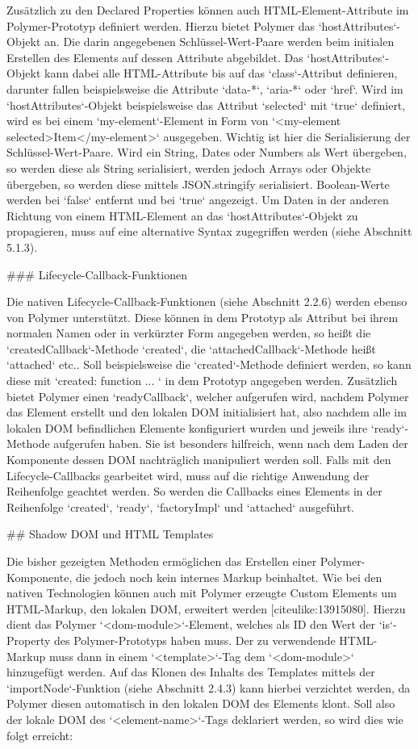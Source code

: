 Zusätzlich zu den Declared Properties können auch HTML-Element-Attribute im Polymer-Prototyp definiert werden. Hierzu bietet Polymer das `hostAttributes`-Objekt an. Die darin angegebenen Schlüssel-Wert-Paare werden beim initialen Erstellen des Elements auf dessen Attribute abgebildet. Das `hostAttributes`-Objekt kann dabei alle HTML-Attribute bis auf das `class`-Attribut definieren, darunter fallen beispielsweise die Attribute `data-*`, `aria-*` oder `href`. Wird im `hostAttributes`-Objekt beispielsweise das Attribut `selected` mit `true` definiert, wird es bei einem `my-element`-Element in Form von `<my-element selected>Item</my-element>` ausgegeben. Wichtig ist hier die Serialisierung der Schlüssel-Wert-Paare. Wird ein String, Dates oder Numbers als Wert übergeben, so werden diese als String serialisiert, werden jedoch Arrays oder Objekte übergeben, so werden diese mittels JSON.stringify serialisiert. Boolean-Werte werden bei `false` entfernt und bei `true` angezeigt. Um Daten in der anderen Richtung von einem HTML-Element an das `hostAttributes`-Objekt zu propagieren, muss auf eine alternative Syntax zugegriffen werden (siehe Abschnitt 5.1.3).


### Lifecycle-Callback-Funktionen

Die nativen Lifecycle-Callback-Funktionen (siehe Abschnitt 2.2.6) werden ebenso von Polymer unterstützt. Diese können in dem Prototyp als Attribut bei ihrem normalen Namen oder in verkürzter Form angegeben werden, so heißt die `createdCallback`-Methode `created`, die `attachedCallback`-Methode heißt `attached` etc.. Soll beispielsweise die `created`-Methode definiert werden, so kann diese mit `created: function { ... }` in dem Prototyp angegeben werden. Zusätzlich bietet Polymer einen `readyCallback`, welcher aufgerufen wird, nachdem Polymer das Element erstellt und den lokalen DOM initialisiert hat, also nachdem alle im lokalen DOM befindlichen Elemente konfiguriert wurden und jeweils ihre `ready`-Methode aufgerufen haben. Sie ist besonders hilfreich, wenn nach dem Laden der Komponente dessen DOM nachträglich manipuliert werden soll. Falls mit den Lifecycle-Callbacks gearbeitet wird, muss auf die richtige Anwendung der Reihenfolge geachtet werden. So werden die Callbacks eines Elements in der Reihenfolge `created`, `ready`, `factoryImpl` und `attached` ausgeführt.


## Shadow DOM und HTML Templates

Die bisher gezeigten Methoden ermöglichen das Erstellen einer Polymer-Komponente, die jedoch noch kein internes Markup beinhaltet. Wie bei den nativen Technologien können auch mit Polymer erzeugte Custom Elements um HTML-Markup, den lokalen DOM, erweitert werden [citeulike:13915080]. Hierzu dient das Polymer `<dom-module>`-Element, welches als ID den Wert der `is`-Property des Polymer-Prototyps haben muss. Der zu verwendende HTML-Markup muss dann in einem `<template>`-Tag dem `<dom-module>` hinzugefügt werden. Auf das Klonen des Inhalts des Templates mittels der `importNode`-Funktion (siehe Abschnitt 2.4.3) kann hierbei verzichtet werden, da Polymer diesen automatisch in den lokalen DOM des Elements klont. Soll also der lokale DOM des `<element-name>`-Tags deklariert werden, so wird dies wie folgt erreicht:

